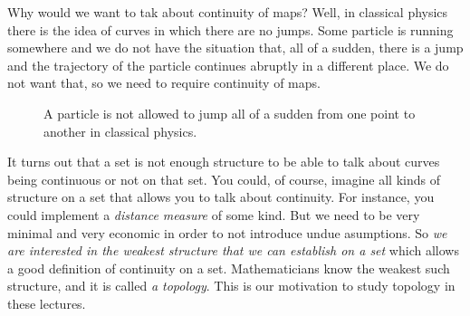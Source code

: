 Why would we want to tak about continuity of maps? Well, in classical physics there is the idea of
curves in which there are no jumps. Some particle is running somewhere and we do not have the
situation that, all of a sudden, there is a jump and the trajectory of the particle continues
abruptly in a different place. We do not want that, so we need to require continuity of maps.
\begin{figure}[ht]
  \centering
  \def\scl{1}
  \caption{A particle is not allowed to jump all of a sudden from one point to another in classical
    physics.}
  \label{fig:topspac-nojumps}
\end{figure}

It turns out that a set is not enough structure to be able to talk about curves being continuous or not
on that set. You could, of course, imagine all kinds of structure on a set that allows you to talk
about continuity. For instance, you could implement a \emph{distance measure} of some kind.
But we need to be very minimal and very economic in order to not introduce undue asumptions.
So \emph{we are interested in the weakest structure that we can establish on a set} which allows
a good definition of continuity on a set. Mathematicians know the weakest such structure, and it is
called \emph{a topology}. This is our motivation to study topology in these lectures.

